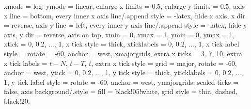	xmode					= log, 
	ymode					= linear,
	enlarge x limits		= 0.5,
	enlarge y limits		= 0.5,
	axis x line				= bottom,	%
	every inner x axis line/.append style	= {-latex},
	hide x axis,
	x dir					= reverse,
	axis y line				= left,		%
	every inner y axis line/.append style	= {-latex},
	hide y axis,
	y dir					= reverse,
	axis on top,
	xmin					= 0,
	xmax					= 1,
	ymin					= 0,
	ymax					= 1,
	xtick					= {0, 0.2, ..., 1},
	x tick style 			= {thick},
	xticklabels				= {0, 0.2, ..., 1},
	x tick label style		= {rotate = -60, anchor = west},
	xmajorgrids,
	extra x ticks			= {3, 7, 10},
	extra x tick labels		= {$t - N$, $t - T$, $t$},
	extra x tick style		= {grid = major, rotate = -60, anchor = west},
	ytick					= {0, 0.2, ..., 1},
	y tick style 			= {thick},
	yticklabels				= {0, 0.2, ..., 1},
	y tick label style		= {rotate = -60, anchor = west},
	ymajorgrids,
	scaled ticks			= false, %
	axis background/.style	= {fill = black!05!white},
	grid style 				= {thin, dashed, black!20},
